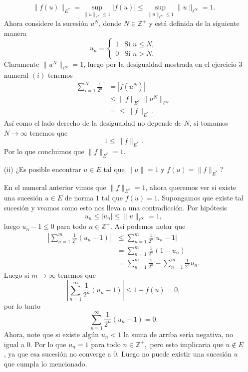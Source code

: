 \begin{enumerate}
\begin{sols}
    $$\|f(u)\|_{E^*}=\sup_{\|u\|_{\ell^\infty}\leq 1}|f(u)|\leq\sup_{\|u\|_{\ell^\infty}\leq 1}\|u\|_{\ell^\infty}= 1.$$
    Ahora considere la sucesión $u^N$, donde $N\in \mathbb{Z}^+$ y está definida de la siguiente manera
    $$u_n=\begin{cases}
        1 & \text{Si }n\leq N,\\
        0 & \text{Si }n>N.
    \end{cases}$$
    Claramente $\|u^N\|_{\ell^\infty}=1$, luego por la desigualdad mostrada en el ejercicio $3$ numeral $(i)$ tenemos
    \begin{align*}
        \sum_{i=1}^N\frac{1}{2^n}&=|f(u^N)|\\
        &\leq\|f\|_{E^*}\|u^N\|_{\ell^\infty}\\
        &=\leq\|f\|_{E^*}
    .\end{align*}
    Así como el lado derecho de la desigualdad no depende de $N$, si tomamos $N\to \infty$ tenemos que 
    $$1\leq\|f\|_{E^*}.$$
    Por lo que concluimos que $\|f\|_{E^*}=1.$
    
    \end{sols}
    \item[(ii)] ¿Es posible encontrar $u \in E$ tal que $\|u\| = 1$ y $f(u) = \|f\|_{E^*}$?
    \begin{sols}
        En el numeral anterior vimos que $\|f\|_{E^*}=1$, ahora queremos ver si existe una sucesión $u\in E$ de norma $1$ tal que $f(u)=1.$ Supongamos que existe tal sucesión y veamos como esto nos lleva a una contradicción. Por hipótesis
        $$u_n\leq |u_n|\leq \|u\|_{\ell^\infty}=1,$$
        luego $u_n-1\leq 0$ para todo $n\in \mathbb{Z}^+.$ Así podemos notar que
        \begin{align*}
        \left|\sum_{n=1}^m\frac{1}{2^n}(u_n-1)\right|&\leq \sum_{n=1}^m\frac{1}{2^n}|u_n-1|\\
        &=\sum_{n=1}^m\frac{1}{2^n}(1-u_n)\\
        &=\sum_{n=1}^m\frac{1}{2^n}-\sum_{n=1}^m\frac{1}{2^n}u_n.
        \end{align*}
        Luego si $m\to \infty$ tenemos que 
        $$\left|\sum_{n=1}^\infty\frac{1}{2^n}(u_n-1)\right|\leq 1-f(u)=0,$$
        por lo tanto  
        $$\sum_{n=1}^\infty\frac{1}{2^n}(u_n-1)=0.$$
        Ahora, note que si existe algún $u_n<1$ la suma de arriba sería negativa, no igual a 0. Por lo que $u_n=1$ para todo $n\in \mathbb{Z}^+,$ pero esto implicaria que $u\notin E$, ya que esa sucesión no converge a 0. Luego no puede existir una sucesión $u$ que cumpla lo mencionado.

    \end{sols}
\end{enumerate}




